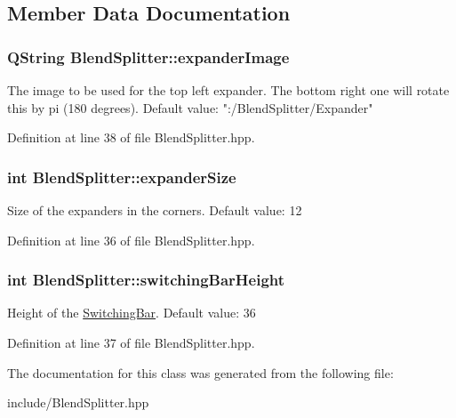 \subsection{Member Data Documentation}
\subsubsection[{\texorpdfstring{expander\+Image}{expanderImage}}]{\setlength{\rightskip}{0pt plus 5cm}Q\+String Blend\+Splitter\+::expander\+Image\hspace{0.3cm}{\ttfamily [static]}}\hypertarget{class_blend_splitter_a38c7ab0fb471718aca5eb3fe09aa124b}{}\label{class_blend_splitter_a38c7ab0fb471718aca5eb3fe09aa124b}
The image to be used for the top left expander. The bottom right one will rotate this by pi (180 degrees). Default value\+: "\+:/\+Blend\+Splitter/\+Expander" 

Definition at line 38 of file Blend\+Splitter.\+hpp.

\subsubsection[{\texorpdfstring{expander\+Size}{expanderSize}}]{\setlength{\rightskip}{0pt plus 5cm}int Blend\+Splitter\+::expander\+Size\hspace{0.3cm}{\ttfamily [static]}}\hypertarget{class_blend_splitter_a233a45efce9417f826d76ce54d832d50}{}\label{class_blend_splitter_a233a45efce9417f826d76ce54d832d50}
Size of the expanders in the corners. Default value\+: 12 

Definition at line 36 of file Blend\+Splitter.\+hpp.

\subsubsection[{\texorpdfstring{switching\+Bar\+Height}{switchingBarHeight}}]{\setlength{\rightskip}{0pt plus 5cm}int Blend\+Splitter\+::switching\+Bar\+Height\hspace{0.3cm}{\ttfamily [static]}}\hypertarget{class_blend_splitter_a478fa3cfcf59f76edf8f021bee297e0d}{}\label{class_blend_splitter_a478fa3cfcf59f76edf8f021bee297e0d}
Height of the \hyperlink{class_switching_bar}{Switching\+Bar}. Default value\+: 36 

Definition at line 37 of file Blend\+Splitter.\+hpp.



The documentation for this class was generated from the following file\+:\begin{DoxyCompactItemize}
\item 
include/Blend\+Splitter.\+hpp\end{DoxyCompactItemize}
